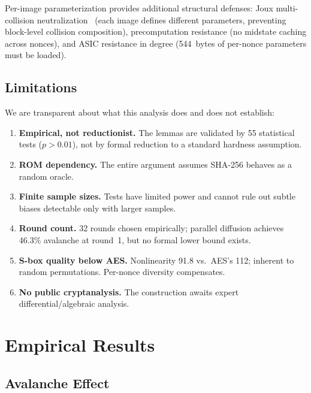 \documentclass[preprint]{iacrtrans}
\begin{document}
Per-image parameterization provides additional structural defenses: Joux multi-collision neutralization~\cite{joux2004} (each image defines different parameters, preventing block-level collision composition), precomputation resistance (no midstate caching across nonces), and ASIC resistance in degree (544~bytes of per-nonce parameters must be loaded).

\subsection{Limitations}

We are transparent about what this analysis does and does not establish:

\begin{enumerate}
    \item \textbf{Empirical, not reductionist.} The lemmas are validated by 55 statistical tests ($p > 0.01$), not by formal reduction to a standard hardness assumption.

    \item \textbf{ROM dependency.} The entire argument assumes SHA-256 behaves as a random oracle.

    \item \textbf{Finite sample sizes.} Tests have limited power and cannot rule out subtle biases detectable only with larger samples.

    \item \textbf{Round count.} 32 rounds chosen empirically; parallel diffusion achieves 46.3\% avalanche at round~1, but no formal lower bound exists.

    \item \textbf{S-box quality below AES.} Nonlinearity 91.8 vs.\ AES's 112; inherent to random permutations. Per-nonce diversity compensates.

    \item \textbf{No public cryptanalysis.} The construction awaits expert differential/algebraic analysis.
\end{enumerate}

\section{Empirical Results}\label{sec:empirical}

\subsection{Avalanche Effect}
\end{document}
